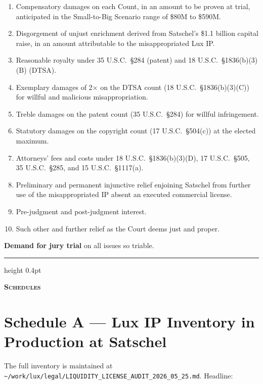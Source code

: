 \documentclass[11pt,letterpaper]{article}
\begin{document}
\begin{enumerate}[leftmargin=1.5em,itemsep=0.1em]
\item Compensatory damages on each Count, in an amount to be proven
at trial, anticipated in the Small-to-Big Scenario range of \$80M to
\$590M.
\item Disgorgement of unjust enrichment derived from Satschel's
\$1.1 billion capital raise, in an amount attributable to the
misappropriated Lux IP.
\item Reasonable royalty under 35 U.S.C.\ \S 284 (patent) and 18
U.S.C.\ \S 1836(b)(3)(B) (DTSA).
\item Exemplary damages of 2$\times$ on the DTSA count (18 U.S.C.\
\S 1836(b)(3)(C)) for willful and malicious misappropriation.
\item Treble damages on the patent count (35 U.S.C.\ \S 284) for
willful infringement.
\item Statutory damages on the copyright count (17 U.S.C.\ \S 504(c))
at the elected maximum.
\item Attorneys' fees and costs under 18 U.S.C.\ \S 1836(b)(3)(D),
17 U.S.C.\ \S 505, 35 U.S.C.\ \S 285, and 15 U.S.C.\ \S 1117(a).
\item Preliminary and permanent injunctive relief enjoining Satschel
from further use of the misappropriated IP absent an executed
commercial license.
\item Pre-judgment and post-judgment interest.
\item Such other and further relief as the Court deems just and
proper.
\end{enumerate}

\textbf{Demand for jury trial} on all issues so triable.

\vspace{1em}
\hrule height 0.4pt
\vspace{0.5em}
\begin{center}
\textbf{\textsc{Schedules}}
\end{center}
\vspace{0.5em}

\section*{Schedule A --- Lux IP Inventory in Production at Satschel}

The full inventory is maintained at
\texttt{\textasciitilde/work/lux/legal/LIQUIDITY\_LICENSE\_AUDIT\_2026\_05\_25.md}.
Headline:
\end{document}
